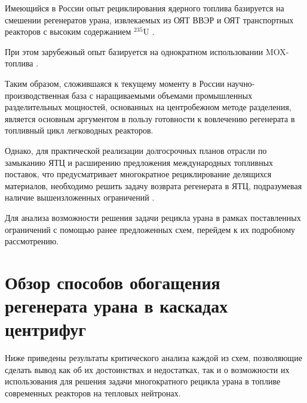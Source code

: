 Имеющийся в России опыт рециклирования ядерного топлива базируется на смешении регенератов урана, извлекаемых из ОЯТ ВВЭР и ОЯТ транспортных реакторов с высоким содержанием $^{235}$U \cite{international2003iaea}.

При этом зарубежный опыт базируется на однократном использовании MOX-топлива \cite{international2003iaea}.


Таким образом, сложившаяся к текущему моменту в России научно-производственная база с наращиваемыми объемами промышленных разделительных мощностей, основанных на центробежном методе разделения, является основным аргументом в пользу готовности к вовлечению регенерата в топливный цикл легководных реакторов.

Однако, для практической реализации долгосрочных планов отрасли по замыканию ЯТЦ и расширению предложения международных топливных поставок, что предусматривает многократное рециклирование делящихся материалов, необходимо решить задачу возврата регенерата в ЯТЦ, подразумевая наличие вышеизложенных ограничений \cite{RosatomGoskorporaciyaRosatoma,panteleyOsobennostiMezhdunarodnogoSotrudnichestva2017}.

Для анализа возможности решения задачи рецикла урана в рамках поставленных ограничений с помощью ранее предложенных схем, перейдем к их подробному рассмотрению.

\section{Обзор способов обогащения регенерата урана в каскадах центрифуг}

Ниже приведены результаты критического анализа каждой из схем, позволяющие сделать вывод как об их достоинствах и недостатках, так и о возможности их использования для решения задачи многократного рецикла урана в топливе современных реакторов на тепловых нейтронах.

